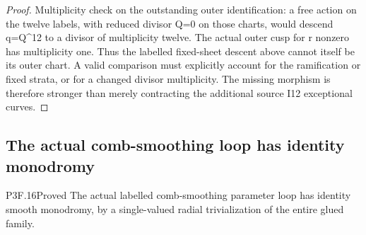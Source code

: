 \begin{proof}
Multiplicity check on the outstanding outer identification: a free action on the twelve labels, with reduced divisor Q=0 on those charts, would descend q=Q\^{}12 to a divisor of multiplicity twelve. The actual outer cusp for r nonzero has multiplicity one. Thus the labelled fixed-sheet descent above cannot itself be its outer chart. A valid comparison must explicitly account for the ramification or fixed strata, or for a changed divisor multiplicity. The missing morphism is therefore stronger than merely contracting the additional source I12 exceptional curves.
\end{proof}
\subsection{The actual comb-smoothing loop has identity monodromy}
\begin{statement}{P3F.16}{Proved}
The actual labelled comb-smoothing parameter loop has identity smooth monodromy, by a single-valued radial trivialization of the entire glued family.
\end{statement}
